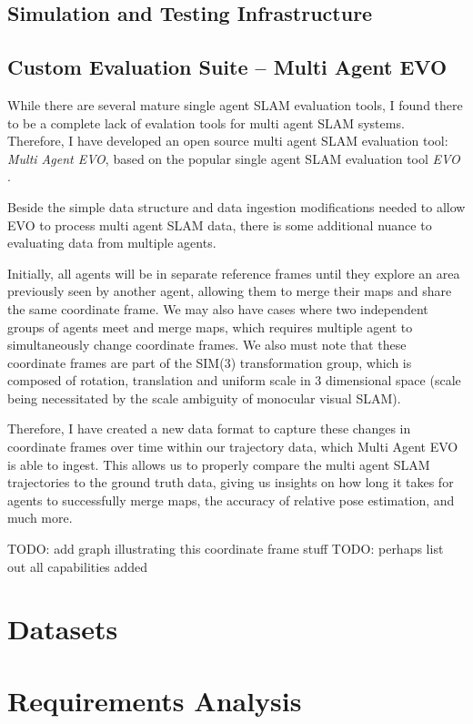 

\subsection{Simulation and Testing Infrastructure}
\label{sec:simulation-and-testing-infrastructure}

\subsection{Custom Evaluation Suite – Multi Agent EVO}
\label{sec:multi-agent-evo}
While there are several mature single agent SLAM evaluation tools, I found there to be a complete lack of evalation tools for multi agent SLAM systems. Therefore, I have developed an open source multi agent SLAM evaluation tool: \textit{Multi Agent EVO}, based on the popular single agent SLAM evaluation tool \textit{EVO} \autocite{grupp2017evo}.

Beside the simple data structure and data ingestion modifications needed to allow EVO to process multi agent SLAM data, there is some additional nuance to evaluating data from multiple agents.

Initially, all agents will be in separate reference frames until they explore an area previously seen by another agent, allowing them to merge their maps and share the same coordinate frame. We may also have cases where two independent groups of agents meet and merge maps, which requires multiple agent to simultaneously change coordinate frames. We also must note that these coordinate frames are part of the SIM(3) transformation group, which is composed of rotation, translation and uniform scale in 3 dimensional space (scale being necessitated by the scale ambiguity of monocular visual SLAM).

Therefore, I have created a new data format to capture these changes in coordinate frames over time within our trajectory data, which Multi Agent EVO is able to ingest. This allows us to properly compare the multi agent SLAM trajectories to the ground truth data, giving us insights on how long it takes for agents to successfully merge maps, the accuracy of relative pose estimation, and much more.

TODO: add graph illustrating this coordinate frame stuff
TODO: perhaps list out all capabilities added

\section{Datasets}
\label{sec:datasets}

\section{Requirements Analysis}
\label{sec:requirements-analysis}

